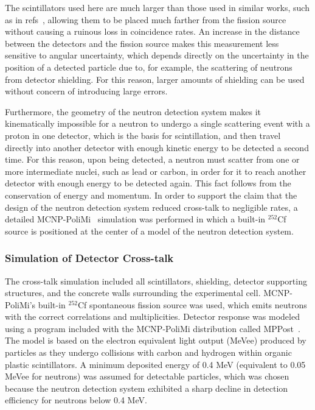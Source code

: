 The scintillators used here are much larger than those used in similar works, such as in refs~\cite{Pozzi2016,Verbeke2018}, allowing them to be placed much farther from the fission source without causing a ruinous loss in coincidence rates. 
An increase in the distance between the detectors and the fission source makes this measurement less sensitive to angular uncertainty, which depends directly on the uncertainty in the position of a detected particle due to, for example, the scattering of neutrons from detector shielding.
For this reason, larger amounts of shielding can be used without concern of introducing large errors.
 
Furthermore, the geometry of the neutron detection system makes it kinematically impossible for a neutron to undergo a single scattering event with a proton in one detector, which is the basis for scintillation, and then travel directly into another detector with enough kinetic energy to be detected a second time.
For this reason, upon being detected, a neutron must scatter from one or more intermediate nuclei, such as lead or carbon, in order for it to reach another detector with enough energy to be detected again.
This fact follows from the conservation of energy and momentum.
In order to support the claim that the design of the neutron detection system reduced cross-talk to negligible rates, a detailed MCNP-PoliMi~\cite{MCNP_POLIMI} simulation was performed in which a built-in $^{252}$Cf source is positioned at the center of a model of the neutron detection system.

\subsubsection{Simulation of Detector Cross-talk}
The cross-talk simulation included all scintillators, shielding, detector supporting structures, and the concrete walls surrounding the experimental cell.
MCNP-PoliMi's built-in $^{252}$Cf spontaneous fission source was used, which emits neutrons with the correct correlations and multiplicities.
Detector response was modeled using a program included with the MCNP-PoliMi distribution called MPPost~\cite{MPPost}.
The model is based on the electron equivalent light output (MeVee) produced by particles as they undergo collisions with carbon and hydrogen within organic plastic scintillators.
A minimum deposited energy of 0.4 MeV (equivalent to 0.05 MeVee for neutrons) was assumed for detectable particles, which was chosen because the neutron detection system exhibited a sharp decline in detection efficiency for neutrons below 0.4 MeV.

